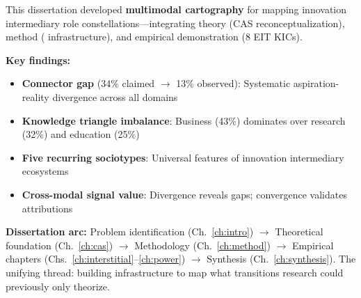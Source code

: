 \documentclass[../main.tex]{subfiles}
\begin{document}
\begin{summarybox}
This dissertation developed \textbf{multimodal cartography} for mapping innovation intermediary role constellations---integrating theory (CAS reconceptualization), method (\RoleBox{} infrastructure), and empirical demonstration (8 EIT KICs).

\vspace{0.5em}
\textbf{Key findings:}
\begin{itemize}[leftmargin=*, itemsep=0.2em]
\item \textbf{Connector gap} (34\% claimed $\rightarrow$ 13\% observed): Systematic aspiration-reality divergence across all domains
\item \textbf{Knowledge triangle imbalance}: Business (43\%) dominates over research (32\%) and education (25\%)
\item \textbf{Five recurring sociotypes}: Universal features of innovation intermediary ecosystems
\item \textbf{Cross-modal signal value}: Divergence reveals gaps; convergence validates attributions
\end{itemize}

\vspace{0.5em}
\textbf{Dissertation arc:} Problem identification (Ch.~\ref{ch:intro}) $\rightarrow$ Theoretical foundation (Ch.~\ref{ch:cas}) $\rightarrow$ Methodology (Ch.~\ref{ch:method}) $\rightarrow$ Empirical chapters (Chs.~\ref{ch:interstitial}--\ref{ch:power}) $\rightarrow$ Synthesis (Ch.~\ref{ch:synthesis}). The unifying thread: building infrastructure to map what transitions research could previously only theorize.
\end{summarybox}
\end{document}
